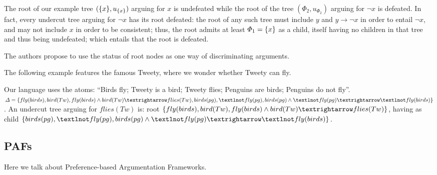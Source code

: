 \documentclass[version=3.21, pagesize, twoside=off, bibliography=totoc, DIV=calc, fontsize=12pt, a4paper, french, english]{scrartcl}
\begin{document}
\begin{example}
	The root of our example tree $(\{x\}, u_{\{x\}})$ arguing for $x$ is undefeated while the root of the tree $(\Phi_2, u_{\Phi_2})$ arguing for $¬x$ is defeated. In fact, every undercut tree arguing for $¬x$ has its root defeated: the root of any such tree must include $y$ and $y → ¬x$ in order to entail $¬x$, and may not include $x$ in order to be consistent; thus, the root admits at least $\Phi_1 = \{x\}$ as a child, itself having no children in that tree and thus being undefeated; which entails that the root is defeated.
\end{example}

The authors propose to use the status of root nodes as one way of discriminating arguments.

The following example features the famous Tweety, where we wonder whether Tweety can fly.
\begin{example}
	Our language uses the atoms: “Birds fly; Tweety is a bird; Tweety flies; Penguins are birds; Penguins do not fly”.
	$\Delta = \set{fly(birds), bird(Tw),\allowbreak fly(birds) \land bird(Tw) → flies(Tw), birds(pg), ¬fly(pg),\allowbreak birds(pg) \land ¬fly(pg) → ¬fly(birds)}$.
	An undercut tree arguing for $flies(Tw)$ is: root $\set{fly(birds),\allowbreak bird(Tw),\allowbreak fly(birds) \land bird(Tw) → flies(Tw)}$, having as child $\set{birds(pg),\allowbreak ¬fly(pg),\allowbreak birds(pg) \land ¬fly(pg) → ¬fly(birds)}$.
\end{example}

\subsection{PAFs}
\label{sec:pafs}
Here we talk about Preference-based Argumentation Frameworks.
\end{document}
